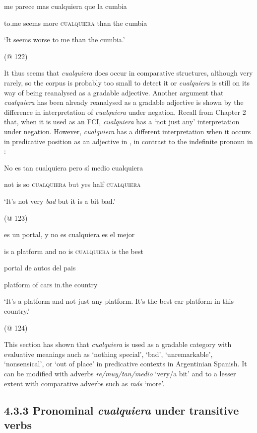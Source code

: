     me  parece  mas  cualquiera  que  la  cumbia

    to.me  seems  more  \textsc{cualquiera}  than  the  cumbia

    ‘It seems worse to me than the cumbia.’

    (@ 122)

It thus seems that \textit{cualquiera} does occur in comparative structures, although very rarely, so the corpus is probably too small to detect it or \textit{cualquiera} is still on its way of being reanalysed as a gradable adjective. Another argument that \textit{cualquiera} has been already reanalysed as a gradable adjective is shown by the difference in interpretation of \textit{cualquiera} under negation. Recall from Chapter 2 that, when it is used as an FCI, \textit{cualquiera} has a ‘not just any’ interpretation under negation. However, \textit{cualquiera} has a different interpretation when it occurs in predicative position as an adjective in , in contrast to the indefinite pronoun in : 

\label{bkm:Ref63460902}    No  es  tan  cualquiera  pero  sí  medio  cualquiera

    not  is  so  \textsc{cualquiera}  but  yes  half  \textsc{cualquiera}

    ‘It’s not very \textit{bad} but it is a bit bad.’

    (@ 123)

\label{bkm:Ref63460922}    es  un  portal,  y  no  es  cualquiera  es  el  mejor  

    is  a  platform  and  no  is  \textsc{cualquiera}  is  the  best

    portal  de  autos  del  pais

    platform  of   cars  in.the  country

    ‘It’s a platform and not just any platform. It’s the best car platform in this country.’

    (@ 124)

This section has shown that \textit{cualquiera} is used as a gradable category with evaluative meanings auch as ‘nothing special’, ‘bad’, ‘unremarkable’, ‘nonsensical’, or ‘out of place’ in predicative contexts in Argentinian Spanish. It can be modified with adverbs \textit{re/muy/tan/medio} ‘very/a bit’ and to a lesser extent with comparative adverbs such as \textit{más} ‘more’.

\subsection{\textbf{4.3.3} \textbf{Pronominal} \textbf{\textit{cualquiera}}\textbf{ }\textbf{under} \textbf{transitive} \textbf{verbs}}

